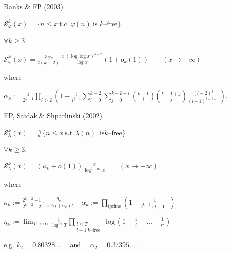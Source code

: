 \documentclass[landscape]{powersem} %
\newcommand{\Ss}{{\mathcal S}}
\newcommand{\matitablu}{\textcolor{MidnightBlue}{\ding{46}}}
\newcommand{\heading}[1]{%
 \begin{center}
  \large\bf
  \shadowbox{{\textcolor{conceptcolor}{#1}}}%
 \end{center}
 \vspace{1ex minus 1ex}}
\begin{document}
\begin{slide}
\heading{$k$--free values of $\varphi$}\pause

\noindent\matitablu \textcolor{OliveGreen}{Banks \& F\!\!P} (2003)\pause

\centerline{$\displaystyle{\Ss_\varphi^k(x)=\{n\leq
x\ \text{t.c.}\ \varphi(n)\ \text{is $k$--free}\}.}$}\pause

$\forall k\ge 3$,
\centerline{$\displaystyle{\Ss_\varphi^k(x)=
\frac{3\alpha_k}{2(k-2)!}\frac{x\,(\log\log x)^{k-2}}{\log x}
\left(1+o_k(1)\right)\qquad (x\to +\infty)}
$}\pause
where
\centerline{$\displaystyle{
\alpha_k:=\frac1{2^{k-1}}\prod_{l>2}\left(1-\frac1{l^{k-1}}\sum_{i=0}^{k-2}\sum_{j=0}^{k-2-i}
\binom{k-1}{i}\binom{k-1+j}{j} \frac{(l-2)^j}{(l-1)^{i+j+1}}\right).
}$}
\end{slide}


\begin{slide}
\heading{$k$--free values of $\lambda$}\pause

\noindent\matitablu \textcolor{OliveGreen}{F\!\!P, Saidak \& Shparlinski} (2002)\pause

\centerline{{{$\displaystyle{\Ss_\lambda^k(x)=\#\{n\leq
x\ \text{s.t.}\ \lambda(n)\ \text{ is
$k$--free}\}}$}}}\pause

$\forall k\ge 3$,
\centerline{$\displaystyle{\Ss_\lambda^k(x)=\left(\kappa_k+
o(1)\right)\frac{x}{\log^{1-\alpha_k}x}\qquad (x\to +\infty)}$}\pause

where\medskip

\centerline{$\displaystyle{\kappa_k:= \frac{2^{k+2}-1}{2^{k+2}-2} \cdot
\frac{\eta_k}{e^{\gamma\alpha_k}\Gamma(\alpha_k)},\quad
\alpha_{k}:=\prod_{l\text{
prime}}\left(1-\frac1{l^{k-1}(l-1)}\right)}$}\medskip\pause

\centerline{$\displaystyle{\eta_k:=\lim_{T\rightarrow\infty}\frac1{\log^{\alpha_k}T}\prod_{\substack{l\leq
T\\ l-1\ \text{$k$--free}}}
\log\left(1+\frac{1}{l}+\ldots+\frac{1}{l^k}\right)}$}
\pause\bigskip\vfill

\centerline{e.g. $k_2=0.80328\ldots\quad\text{ and }\quad\alpha_2=0.37395\ldots$.}

\end{slide}
\end{document}
